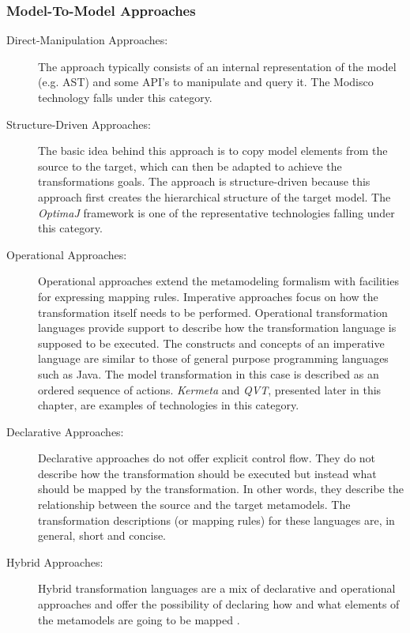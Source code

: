 \subsubsection{Model-To-Model Approaches}
\begin{description}

\item[Direct-Manipulation Approaches:] The approach typically consists of an internal representation of the model (e.g. AST) and some API's to manipulate and query it. The Modisco \cite{ModiscoMain} technology falls under this category.

\item[Structure-Driven Approaches:]
The basic idea behind this approach is to copy model elements from the source to the target, which can  then be adapted to achieve the transformations goals. The approach is structure-driven because this approach first creates the hierarchical structure of the target model. The \textit{OptimaJ} framework is one of the representative technologies falling under this category.

\item[Operational Approaches:]
Operational approaches extend the metamodeling formalism with facilities for expressing mapping rules. 
Imperative approaches focus on how the transformation itself needs to be performed. Operational transformation languages provide support to describe how the transformation language is supposed to be executed. The constructs and concepts of an imperative language are similar to those of general purpose programming languages such as Java. The model transformation in this case is described as an ordered sequence of actions. \textit{Kermeta} and \textit{QVT}, presented later in this chapter, are examples of technologies in this category.

\item[Declarative Approaches:]
Declarative approaches do not offer explicit control flow. They do not describe how the transformation should be executed but instead what should be mapped by the transformation. In other words, they describe the relationship between the source and the target metamodels. The transformation descriptions (or mapping rules) for these languages are, in general, short and concise. 

\item[Hybrid Approaches:]
Hybrid transformation languages are a mix of declarative and operational approaches and offer the possibility of declaring how and what elements of the metamodels are going to be mapped \cite{HybridModelTransform}.


\end{description}
